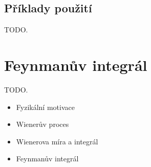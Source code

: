 \documentclass[10pt,a4paper]{article}
\theoremstyle{definition}
\begin{document}
\subsection{Příklady použití}
TODO.

\section{Feynmanův integrál}
TODO.
\begin{itemize}
    \item Fyzikální motivace
    \item Wienerův proces
    \item Wienerova míra a integrál
    \item Feynmanův integrál
\end{itemize}
\end{document}
